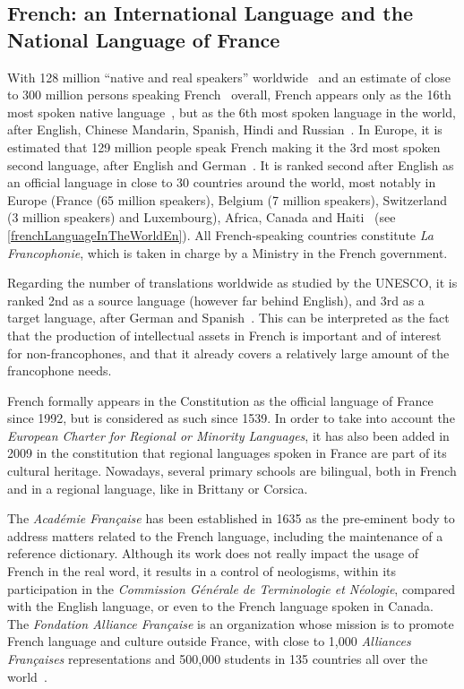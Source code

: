 \clearpage


\begin{multicols}{2}

\subsection{French: an International Language and the National Language of France}
With 128 million ``native and real speakers'' worldwide~\cite{native} and an estimate
of close to 300 million persons speaking French~\cite{francais} overall, French
appears only as the 16th most spoken native language~\cite{Lewis2009}, but as the
6th most spoken language in the world, after English, Chinese
Mandarin, Spanish, Hindi and Russian~\cite{russe}. In Europe, it is estimated
that 129 million people speak French making it the 3rd most spoken
second language, after English and German~\cite{francais}. It is ranked second after
English as an official language in close to 30 countries around the
world, most notably in Europe (France (65 million speakers), Belgium
(7 million speakers), Switzerland (3 million speakers) and
Luxembourg), Africa, Canada and Haiti~\cite{haiti} (see \ref{frenchLanguageInTheWorldEn}). All
French-speaking countries constitute {\em La Francophonie}, which is taken
in charge by a Ministry in the French government.

Regarding the number of translations worldwide as studied by the
UNESCO, it is ranked 2nd as a source language (however far behind
English), and 3rd as a target language, after German and
Spanish~\cite{espagnol}. This can be interpreted as the fact that the production of
intellectual assets in French is important and of interest for
non-francophones, and that it already covers a relatively large amount
of the francophone needs.

French formally appears in the Constitution as the official language
of France since 1992, but is considered as such since 1539. In order
to take into account the {\em European Charter for Regional or Minority
Languages}, it has also been added in 2009 in the constitution that
regional languages spoken in France are part of its cultural
heritage. Nowadays, several primary schools are bilingual, both in
French and in a regional language, like in Brittany or Corsica.

The {\em Académie Française} has been established in 1635 as the pre-eminent
body to address matters related to the French language, including the
maintenance of a reference dictionary. Although its work does not
really impact the usage of French in the real word, it results in a
control of neologisms, within its participation in the {\em Commission
Générale de Terminologie et Néologie}, compared with the English
language, or even to the French language spoken in Canada. The
{\em Fondation Alliance Française} is an organization whose mission is to
promote French language and culture outside France, with close to
1,000 {\em Alliances Françaises} representations and 500,000 students in 135
countries all over the world~\cite{monde}.


\end{multicols}
